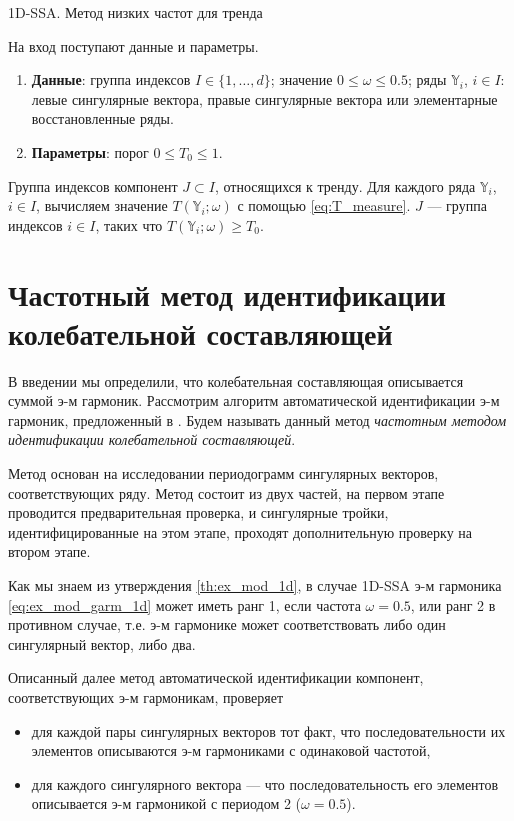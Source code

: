 \documentclass[specialist,
               substylefile = spbu.rtx,
               subf,href,colorlinks=true, 12pt]{disser}
\begin{document}
\begin{algorithm}[!hhh]
\caption{1D-SSA. Метод низких частот для тренда}
\label{alg:freq1d}
\begin{algorithmic}[1]
\REQUIRE На вход поступают данные и параметры.
\begin{enumerate}
\item \textbf{Данные}: группа индексов $I \in \{1,\ldots,d\}$; значение  $0 \leqslant  \omega \leqslant 0.5$; ряды $\mathbb{Y}_i$, $i \in I$: левые сингулярные вектора,
правые сингулярные вектора или элементарные восстановленные ряды.
\item \textbf{Параметры}: порог $0 \leqslant T_0 \leqslant 1$.
\end{enumerate}
\ENSURE Группа индексов компонент $J \subset I$, относящихся к тренду.
\STATE  Для каждого ряда $\mathbb{Y}_i$, $i \in I$, вычисляем значение $T(\mathbb{Y}_i; \omega)$ с помощью \eqref{eq:T_measure}.
\STATE $J$ --- группа индексов $i \in I$, таких что $T(\mathbb{Y}_i; \omega) \geqslant T_0$.
\end{algorithmic}
\end{algorithm}

\section{Частотный метод идентификации колебательной составляющей}
\label{sec:1d_pgram_method}

В введении мы определили, что колебательная составляющая описывается суммой э-м гармоник.
Рассмотрим алгоритм автоматической идентификации э-м гармоник, предложенный в \cite{Alexandrov2006}.
 Будем называть данный метод \textit{частотным методом идентификации колебательной составляющей}.

Метод основан на исследовании периодограмм сингулярных векторов, соответствующих ряду. Метод состоит из двух частей, на первом этапе проводится предварительная проверка, и сингулярные тройки, идентифицированные на этом этапе, проходят дополнительную проверку на втором этапе.

Как мы знаем из утверждения \ref{th:ex_mod_1d}, в случае 1D-SSA э-м гармоника \eqref{eq:ex_mod_garm_1d} может иметь ранг 1, если частота $\omega=0.5$, или ранг 2 в противном случае, т.е. э-м гармонике может соответствовать либо один сингулярный вектор, либо два.

Описанный далее метод автоматической идентификации компонент, соответствующих э-м гармоникам, проверяет
\begin{itemize}
\item для каждой пары сингулярных векторов тот факт, что последовательности их элементов описываются э-м гармониками с одинаковой частотой,
\item для каждого сингулярного вектора --- что последовательность его элементов описывается э-м гармоникой с периодом 2 ($\omega=0.5$).
\end{itemize}
\end{document}
